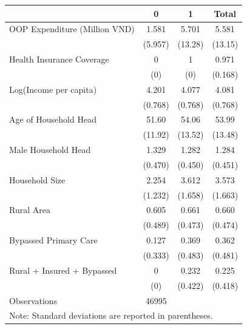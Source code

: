 \begin{tabular}{l*{3}{c}}
\hline\hline
                    &           0&           1&       Total\\
\hline
OOP Expenditure (Million VND)&       1.581&       5.701&       5.581\\
                    &     (5.957)&     (13.28)&     (13.15)\\
[1em]
Health Insurance Coverage&           0&           1&       0.971\\
                    &         (0)&         (0)&     (0.168)\\
[1em]
Log(Income per capita)&       4.201&       4.077&       4.081\\
                    &     (0.768)&     (0.768)&     (0.768)\\
[1em]
Age of Household Head&       51.60&       54.06&       53.99\\
                    &     (11.92)&     (13.52)&     (13.48)\\
[1em]
Male Household Head &       1.329&       1.282&       1.284\\
                    &     (0.470)&     (0.450)&     (0.451)\\
[1em]
Household Size      &       2.254&       3.612&       3.573\\
                    &     (1.232)&     (1.658)&     (1.663)\\
[1em]
Rural Area          &       0.605&       0.661&       0.660\\
                    &     (0.489)&     (0.473)&     (0.474)\\
[1em]
Bypassed Primary Care&       0.127&       0.369&       0.362\\
                    &     (0.333)&     (0.483)&     (0.481)\\
[1em]
Rural + Insured + Bypassed&           0&       0.232&       0.225\\
                    &         (0)&     (0.422)&     (0.418)\\
\hline
Observations        &       46995&            &            \\
\hline\hline
\multicolumn{4}{l}{\footnotesize Note: Standard deviations are reported in parentheses.}\\
\end{tabular}
